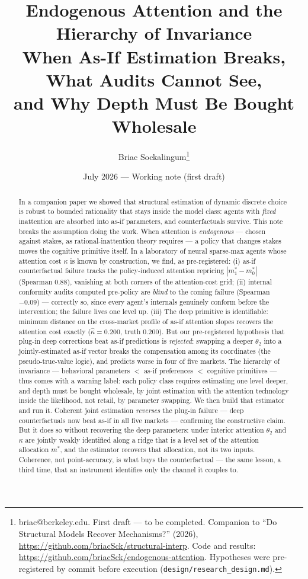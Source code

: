 \documentclass[11pt]{article}
\title{Endogenous Attention and the Hierarchy of Invariance\\
\large When As-If Estimation Breaks, What Audits Cannot See,\\
and Why Depth Must Be Bought Wholesale}
\author{Briac Sockalingum\thanks{briac@berkeley.edu. First draft --- to be
completed. Companion to ``Do Structural Models Recover Mechanisms?''
(2026), \url{https://github.com/briacSck/structural-interp}. Code and
results: \url{https://github.com/briacSck/endogenous-attention}. Hypotheses
were pre-registered by commit before execution
(\texttt{design/research\_design.md}).}}
\date{July 2026 --- Working note (first draft)}
\newcommand{\mstar}{m^{*}}
\begin{document}
\maketitle

\begin{abstract}
\noindent In a companion paper we showed that structural estimation of
dynamic discrete choice is robust to bounded rationality that stays inside
the model class: agents with \emph{fixed} inattention are absorbed into
as-if parameters, and counterfactuals survive. This note breaks the
assumption doing the work. When attention is \emph{endogenous} --- chosen
against stakes, as rational-inattention theory requires --- a policy that
changes stakes moves the cognitive primitive itself. In a laboratory of
neural sparse-max agents whose attention cost $\kappa$ is known by
construction, we find, as pre-registered: (i) as-if counterfactual failure
tracks the policy-induced attention repricing $|m^*_1 - m^*_0|$ (Spearman
0.88), vanishing at both corners of the attention-cost grid; (ii) internal
conformity audits computed pre-policy are \emph{blind} to the coming
failure (Spearman $-0.09$) --- correctly so, since every agent's internals
genuinely conform before the intervention; the failure lives one level up.
(iii) The deep primitive is identifiable: minimum distance on the
cross-market profile of as-if attention slopes recovers the attention cost
exactly ($\widehat{\kappa} = 0.200$, truth $0.200$). But our pre-registered
hypothesis that plug-in deep corrections beat as-if predictions is
\emph{rejected}: swapping a deeper $\theta_2$ into a jointly-estimated
as-if vector breaks the compensation among its coordinates
(the pseudo-true-value logic), and predicts worse in four of five markets.
The hierarchy of invariance --- behavioral parameters $<$ as-if preferences
$<$ cognitive primitives --- thus comes with a warning label: each policy
class requires estimating one level deeper, and depth must be bought
wholesale, by joint estimation with the attention technology inside the
likelihood, not retail, by parameter swapping. We then build that estimator
and run it. Coherent joint estimation \emph{reverses} the plug-in failure
--- deep counterfactuals now beat as-if in all five markets --- confirming
the constructive claim. But it does so without recovering the deep
parameters: under interior attention $\theta_2$ and $\kappa$ are jointly
weakly identified along a ridge that is a level set of the attention
allocation $\mstar$, and the estimator recovers that allocation, not its two
inputs. Coherence, not point-accuracy, is what buys the counterfactual ---
the same lesson, a third time, that an instrument identifies only the
channel it couples to.
\end{abstract}
\end{document}
